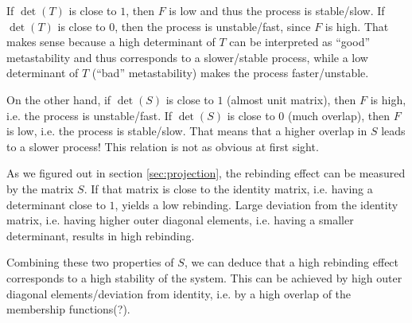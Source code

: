 If $\det(T)$ is close to $1$, then $F$ is low and thus the process is stable/slow.
If $\det(T)$ is close to $0$, then the process is unstable/fast, since $F$ is high.
That makes sense because a high determinant of $T$ can be interpreted as ``good'' metastability and thus corresponds to a slower/stable process, while a low determinant of $T$ (``bad'' metastability) makes the process faster/unstable.

On the other hand, if $\det(S)$ is close to $1$ (almost unit matrix), then $F$
is high, i.e. the process is unstable/fast.
If $\det(S)$ is close to $0$ (much overlap), then $F$ is low, i.e. the process is stable/slow.
That means that a higher overlap in $S$ leads to a slower process!
This relation is not as obvious at first sight.

As we figured out in section \ref{sec:projection}, the rebinding effect can be measured by the matrix $S$. If that matrix is close to the identity matrix, i.e. having a determinant close to $1$, yields a low rebinding. Large deviation from the identity matrix, i.e. having higher outer diagonal elements, i.e. having a smaller determinant, results in high rebinding.


Combining these two properties of $S$, we can deduce that a high rebinding effect corresponds to a high stability of the system. This can be achieved by high outer diagonal elements/deviation from identity, i.e. by a high overlap of the membership functions(?).


